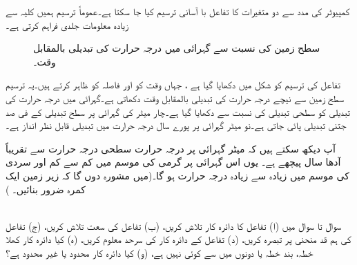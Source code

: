 کمپیوٹر کی مدد سے  دو متغیرات کا  تفاعل با آسانی   ترسیم کیا جا سکتا ہے۔عموماً  ترسیم ہمیں   کلیہ سے زیادہ معلومات   جلدی فراہم کرتی ہے۔

\begin{figure}
\centering
{}
\caption{سطح زمین کی نسبت سے گہرائی میں درجہ حرارت کی تبدیلی بالمقابل وقت۔}
\label{شکل_مثال_کثیر_المتغیر_گہرائی_درجہ_حرارت}
\end{figure}

تفاعل  کی  ترسیم کو شکل   میں دکھایا گیا ہے ، جہاں وقت  کو     اور  فاصلہ کو      ظاہر کرتے ہیں۔یہ ترسیم  سطح زمین سے نیچے درجہ حرارت کی تبدیلی بالمقابل وقت دکھاتی ہے۔گہرائی میں درجہ حرارت کی تبدیلی   کو سطحی تبدیلی کی نسبت سے دکھایا گیا ہے۔چار  میٹر کی گہرائی پر سطح تبدیلی کے  فی صد جتنی تبدیلی پائی جاتی ہے۔نو  میٹر گہرائی پر  پورے سال  درجہ حرارت میں تبدیلی  قابل نظر انداز ہے۔

آپ دیکھ سکتے ہیں کہ  میٹر گہرائی پر درجہ حرارت سطحی درجہ حرارت سے تقریباً آدھا سال پیچھے    ہے۔ یوں اس گہرائی پر  گرمی کی موسم میں  کم سے کم اور  سردی کی موسم میں  زیادہ سے زیادہ درجہ حرارت ہو گا۔(میں مشورہ  دوں گا کہ زیر زمین ایک کمرہ ضرور بنائیں۔ )

\\
سوال  تا سوال  میں (ا) تفاعل کا دائرہ کار تلاش کریں، (ب) تفاعل کی سعت تلاش کریں، (ج) تفاعل کی ہم قد  منحنی پر تبصرہ کریں، (د)  تفاعل کے دائرہ کار کی سرحد معلوم کریں، (ہ) کیا دائرہ کار کھلا خطہ، بند خطہ یا دونوں میں سے کوئی نہیں ہے، (و) کیا دائرہ کار محدود یا غیر محدود ہے؟


